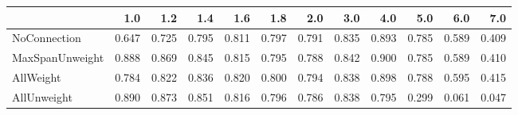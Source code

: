 \begin{tabular}{lrrrrrrrrrrr}
\toprule
{} &   1.0 &   1.2 &   1.4 &   1.6 &   1.8 &   2.0 &   3.0 &   4.0 &   5.0 &   6.0 &   7.0 \\
\midrule
NoConnection    & 0.647 & 0.725 & 0.795 & 0.811 & 0.797 & 0.791 & 0.835 & 0.893 & 0.785 & 0.589 & 0.409 \\
MaxSpanUnweight & 0.888 & 0.869 & 0.845 & 0.815 & 0.795 & 0.788 & 0.842 & 0.900 & 0.785 & 0.589 & 0.410 \\
AllWeight       & 0.784 & 0.822 & 0.836 & 0.820 & 0.800 & 0.794 & 0.838 & 0.898 & 0.788 & 0.595 & 0.415 \\
AllUnweight     & 0.890 & 0.873 & 0.851 & 0.816 & 0.796 & 0.786 & 0.838 & 0.795 & 0.299 & 0.061 & 0.047 \\
\bottomrule
\end{tabular}
